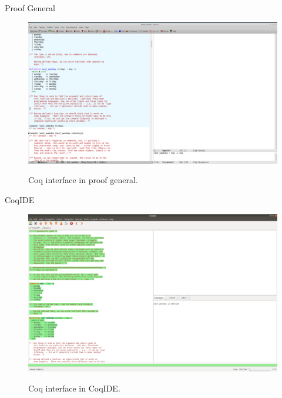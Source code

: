 \documentclass{beamer}
\begin{document}
	
	\begin{frame}{Proof General}
		\begin{figure}[h]
			\includegraphics[width=.9\textwidth]{proofgeneral.png}
			\label{fig:screenshot-proof-general}
			\caption{Coq interface in proof general.}
		\end{figure}
	\end{frame}
	
	\begin{frame}{CoqIDE}
	\begin{figure}[h]
			\includegraphics[width=.9\textwidth]{coqide.png}
			\label{fig:screenshot-coqide}
			\caption{Coq interface in CoqIDE.}
			\end{figure}
	\end{frame}
	
\end{document}
